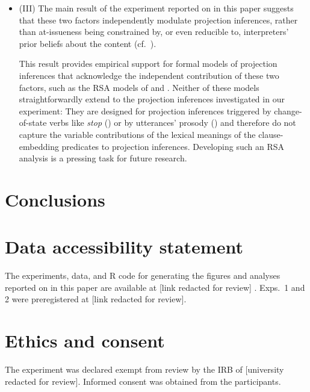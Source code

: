 \documentclass[11pt,fleqn]{article}
\newcommand{\6}{\mbox{$[\hspace*{-.6mm}[$}}
\newcommand{\9}{\mbox{$]\hspace*{-.6mm}]$}}
\begin{document}
\begin{itemize}
\item (III) The main result of the experiment reported on in this paper suggests that these two factors independently modulate projection inferences, rather than at-issueness being constrained by, or even reducible to, interpreters' prior beliefs about the content (cf.\ \citealt{tonhauser-etal-eval}). 

This result provides empirical support for formal models of projection inferences that acknowledge the independent contribution of these two factors, such as the RSA models of \citealt{qing-etal2016} and \citealt{stevens-etal2017}. Neither of these models straightforwardly extend to the projection inferences investigated in our experiment: They are designed for projection inferences triggered by change-of-state verbs like \emph{stop} (\citealt{qing-etal2016}) or by utterances' prosody (\citealt{stevens-etal2017}) and therefore do not capture the variable contributions of the lexical meanings of the clause-embedding predicates to projection inferences. Developing such an RSA analysis is a pressing task for future research.

\end{itemize}

\section{Conclusions}\label{s5}

\section*{Data accessibility statement}

The experiments, data, and R code for generating the figures and analyses reported on in this paper are available at [link redacted for review]
.  Exps.~1 and 2 were preregistered at [link redacted for review].

\section*{Ethics and consent}

The experiment was declared exempt from review by the IRB of [university redacted for review]. Informed consent was obtained from the participants.

\end{document}
